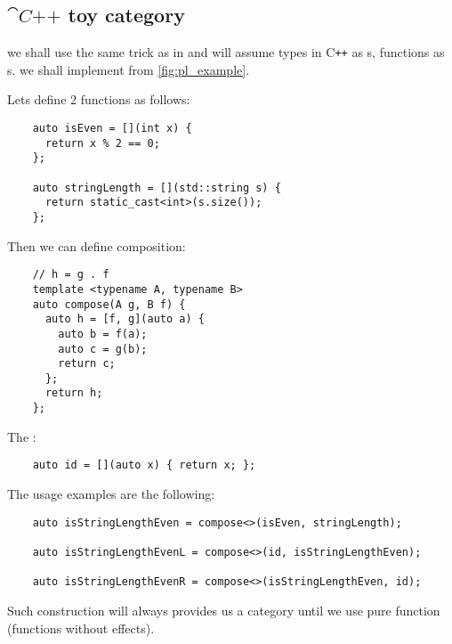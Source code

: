 \subsection{$\cat{C\texttt{++}}$ toy category}
\begin{example}
  \label{ex:cppcategory}
  we shall use the same trick as in  and
  will assume 
  types in C\texttt{++} as s, 
  functions as s. we shall implement
   from \cref{fig:pl_example}.


  Lets define 2 functions as follows:
  \begin{verbatim}
    auto isEven = [](int x) { 
      return x % 2 == 0; 
    };

    auto stringLength = [](std::string s) { 
      return static_cast<int>(s.size()); 
    };
  \end{verbatim}

  Then we can define composition:
  \begin{verbatim}
    // h = g . f
    template <typename A, typename B> 
    auto compose(A g, B f) {
      auto h = [f, g](auto a) {
        auto b = f(a);
        auto c = g(b);
        return c;
      };
      return h;
    };
  \end{verbatim}

  The :
  \begin{verbatim}
    auto id = [](auto x) { return x; };
  \end{verbatim}

  The usage examples are the following:
  \begin{verbatim}
    auto isStringLengthEven = compose<>(isEven, stringLength);

    auto isStringLengthEvenL = compose<>(id, isStringLengthEven);

    auto isStringLengthEvenR = compose<>(isStringLengthEven, id);  
  \end{verbatim}

  Such construction will always provides us a category until we
  use pure function (functions without effects).
\end{example}



